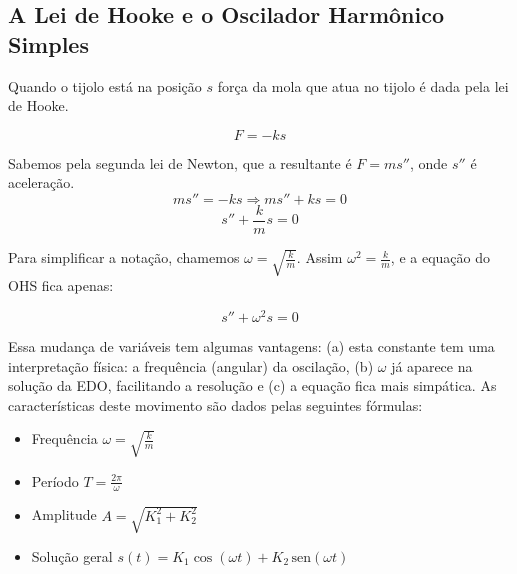 \documentclass[a4paper]{article}
\providecommand{\sin}{} \renewcommand{\sin}{\hspace{2pt}\mathrm{sen}}
\begin{document}
\subsection{A Lei de Hooke e o Oscilador Harmônico Simples}


Quando o tijolo está na posição $s$ força da mola que atua no tijolo é
dada pela lei de Hooke.

\begin{displaymath}
  F = -ks
\end{displaymath}

Sabemos pela segunda lei de Newton, que a resultante é $F=m s''$, onde
$s''$ é aceleração.
\begin{displaymath}
  ms'' = -ks \Rightarrow ms'' +ks =0
\end{displaymath}
\begin{displaymath}
  s''+\frac{k}{m}s=0
\end{displaymath}


Para simplificar a notação, chamemos
$\omega=\sqrt{\frac{k}{m}}$. Assim $\omega^2 = \frac{k}{m}$, e a
equação do OHS fica apenas:

\begin{displaymath}
  s''+\omega^2s=0
\end{displaymath}

Essa mudança de variáveis tem algumas vantagens: (a) esta constante
tem uma interpretação física: a frequência (angular) da oscilação,
(b) $\omega$ já aparece na solução da EDO, facilitando a resolução e
(c) a equação fica mais simpática. As características deste movimento
são dados pelas seguintes fórmulas:



\begin{itemize}
\item Frequência $\omega = \sqrt{\frac{k}{m}}$
\item Período $T= \frac{2\pi}{\omega}$
\item Amplitude $A = \sqrt{K_1^2 + K_2^2}$
\item Solução geral $s(t) = K_1 \cos (\omega t) + K_2 \sin (\omega t)$
\end{itemize}
\end{document}
